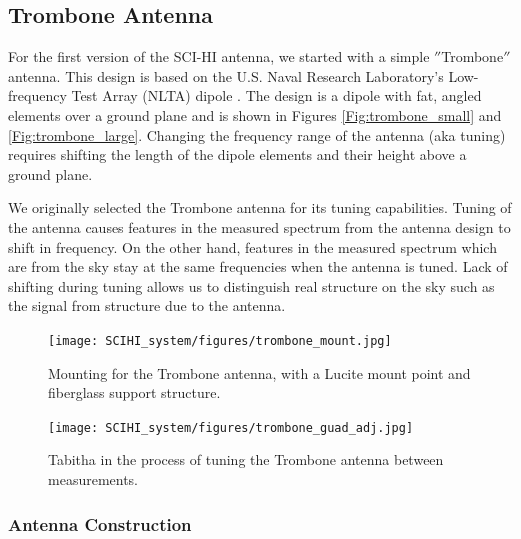 \subsection{Trombone Antenna}

For the first version of the SCI-HI antenna, we started with a simple $''$Trombone$''$ antenna. This design is based on the U.S. Naval Research Laboratory's Low-frequency Test Array (NLTA) dipole \cite{ellingson_2005}. The design is a dipole with fat, angled elements over a ground plane and is shown in Figures \ref{Fig:trombone_small} and \ref{Fig:trombone_large}. Changing the frequency range of the antenna (aka tuning) requires shifting the length of the dipole elements and their height above a ground plane. 

We originally selected the Trombone antenna for its tuning capabilities. Tuning of the antenna causes features in the measured spectrum from the antenna design to shift in frequency. On the other hand, features in the measured spectrum which are from the sky stay at the same frequencies when the antenna is tuned. Lack of shifting during tuning allows us to distinguish real structure on the sky such as the \cm signal from structure due to the antenna. 

\begin{figure}[htb]
\centering
\begin{minipage}[b]{0.54\textwidth}
\centering
\texttt{[image: SCIHI\_system/figures/trombone\_mount.jpg]}
\caption{Mounting for the Trombone antenna, with a Lucite mount point and fiberglass support structure. }
\label{Fig:trombone_mount}
\end{minipage}%
\begin{minipage}[b]{0.02\textwidth}
\hspace{1cm}
\end{minipage}%
\begin{minipage}[b]{0.43\textwidth}
\centering
\texttt{[image: SCIHI\_system/figures/trombone\_guad\_adj.jpg]}
\caption{Tabitha in the process of tuning the Trombone antenna between measurements.}
\label{Fig:trombone_adj}
\end{minipage}
\end{figure}

\subsubsection{Antenna Construction}

